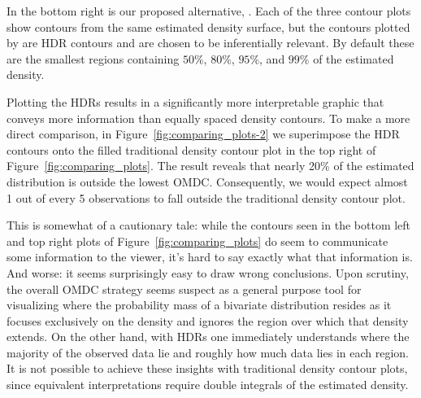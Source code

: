 In the bottom right is our proposed alternative, .
Each of the three contour plots show contours from the same estimated density surface, but the contours plotted by  are HDR contours and are chosen to be inferentially relevant.
By default these are the smallest regions containing $50\%$, $80\%$, $95\%$, and $99\%$ of the estimated density.

Plotting the HDRs results in a significantly more interpretable graphic that conveys more information than equally spaced density contours.
To make a more direct comparison, in Figure~\ref{fig:comparing_plots-2} we superimpose the HDR contours onto the filled traditional density contour plot in the top right of Figure~\ref{fig:comparing_plots}.
The result reveals that nearly 20\% of the estimated distribution is outside the lowest OMDC.
Consequently, we would expect almost 1 out of every 5 observations to fall outside the traditional density contour plot.

This is somewhat of a cautionary tale: while the contours seen in the bottom left and top right plots of Figure~\ref{fig:comparing_plots} do seem to communicate some information to the viewer, it's hard to say exactly what that information is.
And worse: it seems surprisingly easy to draw wrong conclusions.
Upon scrutiny, the overall OMDC strategy seems suspect as a general purpose tool for visualizing where the probability mass of a bivariate distribution resides as it focuses exclusively on the density and ignores the region over which that density extends.
On the other hand, with HDRs one immediately understands where the majority of the observed data lie and
roughly how much data lies in each region.
It is not possible to achieve these insights with traditional density contour plots, since equivalent interpretations require double integrals of the estimated density.





